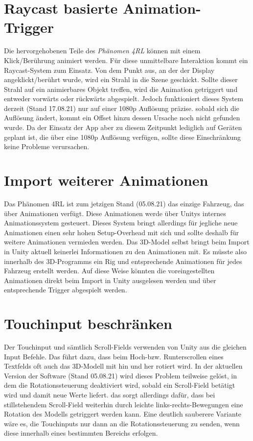 \section{Raycast basierte Animation-Trigger}
%
Die hervorgehobenen Teile des \emph{Phänomen 4RL} können mit einem Klick/Berührung animiert werden. Für diese unmittelbare Interaktion kommt ein Raycast-System zum Einsatz. Von dem Punkt aus, an der der Display angeklickt/berührt wurde, wird ein Strahl in die Szene geschickt. Sollte dieser Strahl auf ein animierbares Objekt treffen, wird die Animation getriggert und entweder vorwärts oder rückwärts abgespielt. Jedoch funktioniert dieses System derzeit (Stand 17.08.21) nur auf einer 1080p Auflösung präzise. sobald sich die Auflösung ändert, kommt ein Offset hinzu dessen Ursache noch nicht gefunden wurde. Da der Einsatz der App aber zu diesem Zeitpunkt lediglich auf Geräten geplant ist, die über eine 1080p Auflösung verfügen, sollte diese Einschränkung keine Probleme verursachen.
%
\section{Import weiterer Animationen}
\label{sec:imp_anim}
%
Das Phänomen 4RL ist zum jetzigen Stand (05.08.21) das einzige Fahrzeug, das über Animationen verfügt. Diese Animationen werde über Unitys internes Animationssystem gesteuert. Dieses System bringt allerdings für jegliche neue Animationen einen sehr hohen Setup-Overhead mit sich und sollte deshalb für weitere Animationen vermieden werden. Das 3D-Model selbst bringt beim Import in Unity aktuell keinerlei Informationen zu den Animationen mit. Es müsste also innerhalb des 3D-Programms ein Rig und entsprechende Animationen für jedes Fahrzeug erstellt werden. Auf diese Weise könnten die voreingestellten Animationen direkt beim Import in Unity ausgelesen werden und über entsprechende Trigger abgespielt werden.
%
\section{Touchinput beschränken}
\label{sec:limit_touch}
%
Der Touchinput und sämtlich Scroll-Fields verwenden von Unity aus die gleichen Input Befehle. Das führt dazu, dass beim Hoch-bzw. Runterscrollen eines Textfelds oft auch das 3D-Modell mit hin und her rotiert wird. In der aktuellen 
Version der Software (Stand 05.08.21) wird dieses Problem teilweise gelöst, in dem die Rotationssteuerung deaktiviert wird, sobald ein Scroll-Field betätigt wird und damit neue Werte liefert. das sorgt allerdings dafür, dass bei stillstehendem Scroll-Field weiterhin durch leichte links-rechts-Bewegungen eine Rotation des Modells getriggert werden kann. Eine deutlich sauberere Variante wäre es, die Touchinputs nur dann an die Rotationssteuerung zu senden, wenn diese innerhalb eines bestimmten Bereichs erfolgen.